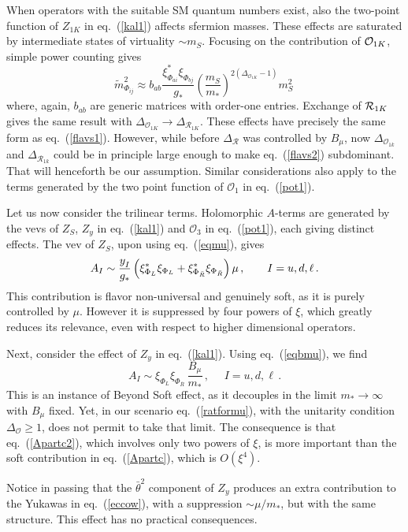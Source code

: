 \documentclass[a4paper,12pt]{article}
\newcommand{\beq}{\begin{equation}}
\newcommand{\eeq}{\end{equation}}
\def\eq#1{eq.~(\ref{#1})}
\def\eq#1{eq.~(\ref{#1})}
\def\O{\mathcal{O}}
\def\R{\mathcal{R}}
\def\mst{m_*}
\def\mS{m_S}
\begin{document}
When operators with the  suitable SM quantum numbers exist, also the two-point function of $Z_{1K}$ in \eq{kal1} affects
sfermion masses. These effects  are saturated by intermediate states  of  virtuality $\sim \mS$. Focusing on the contribution of ${\cal O}_{1K}$, simple power counting gives
\beq
{\tilde m}^2_{\Phi_{ij}} \approx  {b}_{ab}\frac{{\xi}_{\Phi_{ai}}^* {\xi}_{\Phi_{bj}}}{g_*}\left( \frac{\mS}{\mst} \right)^{2(\Delta_{\O_{1K}}-1)} \! \mS^2 
\, 
\label{flavs2}
\eeq 
where, again, $b_{ab}$ are generic matrices with order-one entries.
Exchange of ${\cal R}_{{1K}}$ gives the same result with $\Delta_{\O_{{1K}}}\to \Delta_{\R_{{1K}}}$. These effects have precisely the same form as \eq{flavs1}. However, while before $\Delta_{\R}$ was controlled by $B_\mu$, now $\Delta_{\O_{1k}}$ and $ \Delta_{\R_{1k}}$
could be in principle large enough to make \eq{flavs2} subdominant.
That will henceforth be our assumption. Similar considerations also apply to the terms generated by the two point function of $\O_1$ in \eq{pot1}. 

Let us now consider the trilinear terms. Holomorphic $A$-terms
are generated by the vevs of $Z_S$, $Z_y$ in \eq{kal1} and $\O_3$ in \eq{pot1}, each giving  distinct effects.
The vev of $Z_S$, upon using \eq{eqmu}, gives
\beq
A_{I} \sim \frac{y_{\raisebox{-1.5pt}{$\scriptstyle I$}}}{g_*} \left( 
\xi^*_{\Phi_{L}} \xi_{\Phi_{L}} +
\xi^*_{\Phi_{\bar R}}\xi_{\Phi_{\bar R}} \right) 
\mu \, ,~~~~~~I=u,d,\ell \, .
\label{Apartc}
\eeq
This contribution  is  flavor non-universal and 
genuinely soft, as it is purely controlled by $\mu$.   However it is suppressed by four powers of $\xi$, which greatly reduces its relevance, even with respect to higher dimensional operators. 

Next, consider the effect of $Z_y$ in \eq{kal1}. Using \eq {eqbmu}, we find
\beq
A_{I} \sim 
 \xi_{\Phi_{L}} \xi_{\Phi_{\bar R}}\, \frac{B_\mu}{\mst} \, ,~~~~~~I=u,d,\ell \, .
\label{Apartc2}
\eeq
This is an instance of Beyond Soft effect, as it decouples in the  limit $\mst\to \infty$ with $B_\mu$ fixed. Yet, in our scenario \eq{ratformu}, with the unitarity condition $\Delta_\O\geq 1$,  does not permit to take that limit. The consequence is that  \eq{Apartc2}, which involves only two powers of $\xi$,  is more important than the soft contribution in \eq{Apartc}, which is $O(\xi^4)$.

Notice in passing that the $\bar \theta^2$ component of $Z_y$ produces  an extra contribution to the Yukawas in \eq{eccow},  with a suppression $\sim \mu/\mst$, but with the same structure. This effect has no practical consequences.
\end{document}
